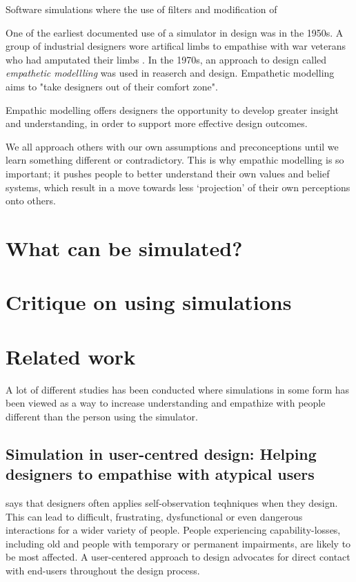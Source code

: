 Software simulations where the use of filters and modification of 

One of the earliest documented use of a simulator in design was in the 1950s. A group of industrial designers wore artifical limbs to empathise with war veterans who had amputated their limbs \parencite[3]{Cardoso2012}. In the 1970s, an approach to design called \textit{empathetic modellling} was used in reaserch and design. Empathetic modelling aims to "take designers out of their comfort zone". 
\begin{displayquote}
    Empathic modelling offers designers the opportunity to develop greater insight and understanding, in order to support more effective design outcomes.
    
    We all approach others with our own assumptions and preconceptions until we learn something different or contradictory. This is why empathic modelling is so important; it pushes people to better understand their own values and belief systems, which result in a move towards less ‘projection’ of their own perceptions onto others.
\end{displayquote}
\section{What can be simulated?}

\section{Critique on using simulations}



\section{Related work}
A lot of different studies has been conducted where simulations in some form has been viewed as a way to increase understanding and empathize with people different than the person using the simulator. 

\subsection{Simulation in user-centred design: Helping designers to empathise with atypical users}
\textcite{Cardoso2012} says that designers often applies self-observation teqhniques when they design. This can lead to difficult, frustrating, dysfunctional or even dangerous interactions for a wider variety of people. People experiencing capability-losses, including old and people with temporary or permanent impairments, are likely to be most affected. A user-centered approach to design advocates for direct contact with end-users throughout the design process. 

